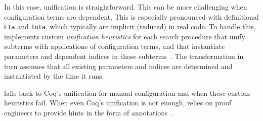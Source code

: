 In this case, unification is straightforward. %
This can be more challenging when configuration terms are dependent.
This is especially pronounced with definitional \lstinline{Eta} and \lstinline{Iota},
which typically are implicit (reduced) in real code.
To handle this, \toolname implements custom \textit{unification heuristics} for each search procedure
that unify subterms with applications of configuration terms, and that instantiate parameters and dependent indices in those subterms~\href{https://github.com/uwplse/pumpkin-pi/blob/v2.0.0/plugin/src/automation/lift/liftconfig.ml}{}. %
The transformation in turn assumes that all existing parameters and indices are determined and instantiated
by the time it runs.

\toolname falls back to Coq's unification for manual configuration and when these custom heuristics fail.
When even Coq's unification is not enough, \toolname relies on proof engineers to provide hints
in the form of annotations~\href{https://github.com/uwplse/pumpkin-pi/blob/v2.0.0/plugin/coq/nonorn.v}{}.

